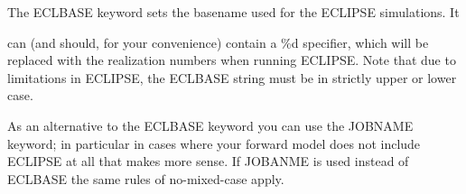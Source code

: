\documentclass[a4paper,10pt,english]{sphinxmanual}
\begin{document}
\begin{sphinxShadowBox}

\begin{DUlineblock}{0em}
\item[] The ECLBASE keyword sets the basename used for the ECLIPSE simulations. It
\end{DUlineblock}

can (and should, for your convenience) contain a \%d specifier, which will be
replaced with the realization numbers when running ECLIPSE. Note that due to
limitations in ECLIPSE, the ECLBASE string must be in strictly upper or lower
case.


%
\begin{sphinxVerbatim}[commandchars=\\\{\}]
     
        
     
 
 
 
 
   
 
\end{sphinxVerbatim}
\end{sphinxShadowBox}
\label{\detokenize{keywords/index:jobname}}
\begin{sphinxShadowBox}

As an alternative to the ECLBASE keyword you can use the JOBNAME keyword; in
particular in cases where your forward model does not include ECLIPSE at all
that makes more sense. If JOBANME is used instead of ECLBASE the same rules of
no-mixed-case apply.
\end{sphinxShadowBox}
\end{document}

